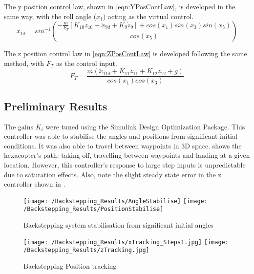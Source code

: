 The y position control law, shown in \eqref{eqn:YPosContLaw}, is developed in the same way, with the roll angle ($x_{1}$) acting as the virtual control. 
\begin{equation}\label{eqn:YPosContLaw}
x_{1d}=sin^{-1}\left(\frac{-\frac{m}{F_{T}}[K_{10}z_{10}+\ddot{x}_{9d}+K_{9}\dot{z}_{9}]+cos(x_{1})sin(x_{3})sin(x_{5})}{cos(x_{5})}\right)
\end{equation}
 
The z position control law in \eqref{eqn:ZPosContLaw} is developed following the same method, with $F_{T}$ as the control input.
\begin{equation}\label{eqn:ZPosContLaw}
F_{T}=\frac{m(\ddot{x}_{11d}+K_{11}\dot{z}_{11}+K_{12}z_{12}+g)}{cos(x_{1})cos(x_{3})}
\end{equation}

\subsection{Preliminary Results}
 
The gains $K_{i}$ were tuned using the Simulink Design Optimization Package. This controller was able to stabilise the angles and positions from significant initial conditions. It was also able to travel between waypoints in 3D space.  shows the hexacopter's path: taking off, travelling between waypoints and landing at a given location. However, this controller's response to large step inputs is unpredictable due to saturation effects. Also, note the slight steady state error in the z controller shown in .

\begin{figure}[htb]
\begin{center}
	\texttt{[image: /Backstepping\_Results/AngleStabilise]}
	\texttt{[image: /Backstepping\_Results/PositionStabilise]}%
	\end{center}
	\caption{Backstepping system stabilisation from significant initial angles}%
	\label{fig:Backstepping_Stabilise}%
\end{figure}

\begin{figure}[htb]
\begin{center}
	\texttt{[image: /Backstepping\_Results/xTracking\_Steps1.jpg]}%
	\texttt{[image: /Backstepping\_Results/zTracking.jpg]}%
	\end{center}
	\caption{Backstepping Position tracking}%
	\label{fig:Backstep_posTrack}%
\end{figure}

